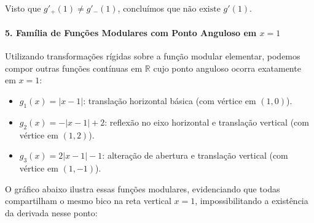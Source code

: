 \noindent
Visto que $g'_+(1) \neq g'_-(1)$, concluímos que $\text{não existe } g'(1)$.

\vspace{0.4cm}

\paragraph*{5. Família de Funções Modulares com Ponto Anguloso em $x = 1$}

\noindent
Utilizando transformações rígidas sobre a função modular elementar, podemos compor outras funções contínuas em $\mathbb{R}$ cujo ponto anguloso ocorra exatamente em $x = 1$:
\begin{itemize}[noitemsep, topsep=3pt]
    \item $g_1(x) = |x - 1|$: translação horizontal básica (com vértice em $(1, 0)$).
    \item $g_2(x) = -|x - 1| + 2$: reflexão no eixo horizontal e translação vertical (com vértice em $(1, 2)$).
    \item $g_3(x) = 2|x - 1| - 1$: alteração de abertura e translação vertical (com vértice em $(1, -1)$).
\end{itemize}

\vspace{1.2cm}
\noindent
O gráfico abaixo ilustra essas funções modulares, evidenciando que todas compartilham o mesmo bico na reta vertical $x = 1$, impossibilitando a existência da derivada nesse ponto:

